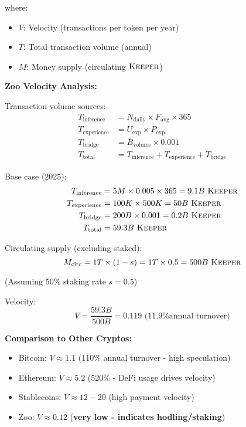 \documentclass[11pt,letterpaper]{article}
\theoremstyle{definition}
\theoremstyle{remark}
\newcommand{\KEEPER}{\textsc{Keeper}}
\begin{document}
where:
\begin{itemize}
\item $V$: Velocity (transactions per token per year)
\item $T$: Total transaction volume (annual)
\item $M$: Money supply (circulating $\KEEPER$)
\end{itemize}

\textbf{Zoo Velocity Analysis:}

Transaction volume sources:
\begin{align}
T_{\text{inference}} &= N_{\text{daily}} \times F_{\text{avg}} \times 365 \\
T_{\text{experience}} &= U_{\text{exp}} \times P_{\text{exp}} \\
T_{\text{bridge}} &= B_{\text{volume}} \times 0.001 \\
T_{\text{total}} &= T_{\text{inference}} + T_{\text{experience}} + T_{\text{bridge}}
\end{align}

Base case (2025):
\begin{align}
T_{\text{inference}} &= 5M \times 0.005 \times 365 = 9.1B \text{ } \KEEPER \\
T_{\text{experience}} &= 100K \times 500K = 50B \text{ } \KEEPER \\
T_{\text{bridge}} &= 200B \times 0.001 = 0.2B \text{ } \KEEPER \\
T_{\text{total}} &= 59.3B \text{ } \KEEPER
\end{align}

Circulating supply (excluding staked):
\begin{equation}
M_{\text{circ}} = 1T \times (1 - s) = 1T \times 0.5 = 500B \text{ } \KEEPER
\end{equation}

(Assuming 50\% staking rate $s = 0.5$)

Velocity:
\begin{equation}
V = \frac{59.3B}{500B} = 0.119 \text{ (11.9\% annual turnover)}
\end{equation}

\textbf{Comparison to Other Cryptos:}
\begin{itemize}
\item Bitcoin: $V \approx 1.1$ (110\% annual turnover - high speculation)
\item Ethereum: $V \approx 5.2$ (520\% - DeFi usage drives velocity)
\item Stablecoins: $V \approx 12-20$ (high payment velocity)
\item Zoo: $V \approx 0.12$ (\textbf{very low - indicates hodling/staking})
\end{itemize}
\end{document}
